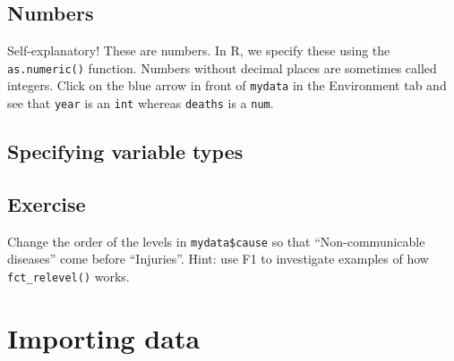 \documentclass[]{book}
\makeatletter
\newenvironment{Shaded}{\begin{snugshade}}{\end{snugshade}}
\newcommand{\KeywordTok}[1]{\textcolor[rgb]{0.13,0.29,0.53}{\textbf{#1}}}
\newcommand{\StringTok}[1]{\textcolor[rgb]{0.31,0.60,0.02}{#1}}
\newcommand{\CommentTok}[1]{\textcolor[rgb]{0.56,0.35,0.01}{\textit{#1}}}
\newcommand{\OperatorTok}[1]{\textcolor[rgb]{0.81,0.36,0.00}{\textbf{#1}}}
\newcommand{\NormalTok}[1]{#1}
\newenvironment{kframe}{%
\medskip{}
\setlength{\fboxsep}{.8em}
 \def\at@end@of@kframe{}%
 \ifinner\ifhmode%
  \def\at@end@of@kframe{\end{minipage}}%
  \begin{minipage}{\columnwidth}%
 \fi\fi%
 \def\FrameCommand##1{\hskip\@totalleftmargin \hskip-\fboxsep
 \colorbox{shadecolor}{##1}\hskip-\fboxsep
     \hskip-\linewidth \hskip-\@totalleftmargin \hskip\columnwidth}%
 \MakeFramed {\advance\hsize-\width
   \@totalleftmargin\z@ \linewidth\hsize
   \@setminipage}}%
 {\par\unskip\endMakeFramed%
 \at@end@of@kframe}
\renewenvironment{Shaded}{\begin{kframe}}{\end{kframe}}
\makeatother
\begin{document}
\subsection{Numbers}\label{numbers}

Self-explanatory! These are numbers. In R, we specify these using the
\texttt{as.numeric()} function. Numbers without decimal places are
sometimes called integers. Click on the blue arrow in front of
\texttt{mydata} in the Environment tab and see that \texttt{year} is an
\texttt{int} whereas \texttt{deaths} is a \texttt{num}.

\subsection{Specifying variable types}\label{specifying-variable-types}

\begin{Shaded}
\end{Shaded}

\subsection{Exercise}\label{exercise-9}

Change the order of the levels in \texttt{mydata\$cause} so that
``Non-communicable diseases'' come before ``Injuries''. Hint: use F1 to
investigate examples of how \texttt{fct\_relevel()} works.

\section{Importing data}\label{importing-data}
\end{document}
